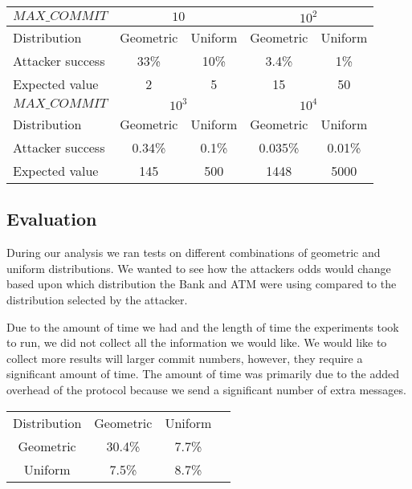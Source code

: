 \documentclass[10pt,letterpaper]{article}
\begin{document}
\begin{multicols}{2}
\begin{center}
  \begin{tabular}{ l | c c | c c}
    $MAX\_COMMIT$ & \multicolumn{2}{|c|}{$10$} & \multicolumn{2}{|c}{$10^2$}\\
    \hline
    Distribution & Geometric & Uniform & Geometric & Uniform\\
    Attacker success & 33\% & 10\%  & 3.4\% & 1\%\\
    Expected value & 2 & 5 & 15 & 50\\
    \hline \hline
    $MAX\_COMMIT$ & \multicolumn{2}{|c|}{$10^3$} & \multicolumn{2}{|c}{$10^4$}\\
    \hline
    Distribution & Geometric & Uniform & Geometric & Uniform\\
    Attacker success & 0.34\% & 0.1\%  & 0.035\% & 0.01\%\\
    Expected value & 145 & 500 & 1448 & 5000\\
  \end{tabular}
\end{center}



\subsection{Evaluation}

During our analysis we ran tests on different combinations of geometric and uniform distributions. We wanted to see how the attackers odds would change based upon which distribution the Bank and ATM were using compared to the distribution selected by the attacker.

Due to the amount of time we had and the length of time the experiments took to run, we did not collect all the information we would like. We would like to collect more results will larger commit numbers, however, they require a significant amount of time. The amount of time was primarily due to the added overhead of the protocol because we send a significant number of extra messages.

\begin{center}
  \begin{tabular}{ c c c c  }
    \hline
    Distribution & Geometric & Uniform \\
    Geometric & 30.4\% & 7.7\%\\
    Uniform & 7.5\% & 8.7\%\\
    \hline
  \end{tabular}
\end{center}


\end{multicols}
\end{document}
